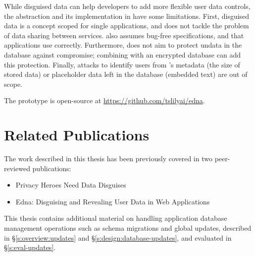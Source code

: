%
While disguised data can help developers to add more flexible user data
controls, the abstraction and its implementation in \sys have some limitations. 
%
First, disguised data is a concept scoped for single applications, and does not
tackle the problem of data sharing between services.
%
%
\sys also assumes bug-free \xx specifications, and that applications use \sys
correctly.
%
Furthermore, \sys does not aim to protect un\xxed data in the database against compromise;
combining \sys with an encrypted database can add this protection.
%
Finally, attacks to identify users from \sys's metadata (\eg the size of
stored \xxed data) or placeholder data left in the database (\eg embedded text)
are out of scope.
%

The \sys prototype is open-source at \url{https://github.com/tslilyai/edna}.

\section{Related Publications}
The work described in this thesis has been previously covered in two
peer-reviewed publications:

\begin{itemize}
    \item Privacy Heroes Need Data Disguises~\cite{edna-hotos}
    \item Edna: Disguising and Revealing User Data in Web Applications~\cite{edna}
\end{itemize}
%
This thesis contains additional material on handling application database
management operations such as schema migrations and global updates, described
in \S\ref{s:overview:updates} and \S\ref{s:design:database-updates}, and evaluated in
\S\ref{s:eval-updates}.

\iffalse
\section{Remaining Work: Revealing with Schema Migrations and Application
Updates}

In \sys's current design, \textbf{application updates} that implicitly enforce
invariants on application data remain unknown (and thus uncheckable) by \sys.
\sys also fails to reveal disguised data affected by \textbf{schema migrations}
performed since the time of disguise.
%
We will add an API for developers to log important updates and schema migrations with \sys, which \sys will apply to disguised data prior to restoring it to the database.

\sys will apply these updates or schema migrations prior to performing \sys's
existing consistency checks; these checks enable \sys to detect if revealing
transformations will violate referential integrity or other structual database
invariants (\eg uniqueness requirements). 

\fi
